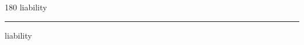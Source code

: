 
\begin{frame}
\begin{center}
\begin{turn}{180}
{\fontsize{2.5cm}{1em}\selectfont liability}
\end{turn}
\vspace{1em}\par  
\hrule
\vspace{1em}\par  
{\fontsize{2.5cm}{1em}\selectfont liability}
\end{center}
\end{frame}
